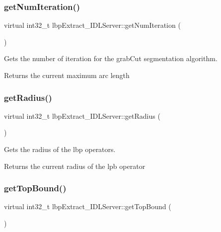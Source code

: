 \subsubsection{\texorpdfstring{getNumIteration()}{getNumIteration()}}
{\footnotesize\ttfamily virtual int32\+\_\+t lbp\+Extract\+\_\+\+I\+D\+L\+Server\+::get\+Num\+Iteration (\begin{DoxyParamCaption}{ }\end{DoxyParamCaption})\hspace{0.3cm}{\ttfamily [virtual]}}



Gets the number of iteration for the grab\+Cut segmentation algorithm. 

\begin{DoxyReturn}{Returns}
the current maximum arc length 
\end{DoxyReturn}
\mbox{\label{classlbpExtract__IDLServer_a8c9a3adfcb9e7d37c4388bc3950da23b}} 
\subsubsection{\texorpdfstring{getRadius()}{getRadius()}}
{\footnotesize\ttfamily virtual int32\+\_\+t lbp\+Extract\+\_\+\+I\+D\+L\+Server\+::get\+Radius (\begin{DoxyParamCaption}{ }\end{DoxyParamCaption})\hspace{0.3cm}{\ttfamily [virtual]}}



Gets the radius of the lbp operators. 

\begin{DoxyReturn}{Returns}
the current radius of the lpb operator 
\end{DoxyReturn}
\mbox{\label{classlbpExtract__IDLServer_a693ea8bf9638a27fdf3f7d40f7ad8f51}} 
\subsubsection{\texorpdfstring{getTopBound()}{getTopBound()}}
{\footnotesize\ttfamily virtual int32\+\_\+t lbp\+Extract\+\_\+\+I\+D\+L\+Server\+::get\+Top\+Bound (\begin{DoxyParamCaption}{ }\end{DoxyParamCaption})\hspace{0.3cm}{\ttfamily [virtual]}}



